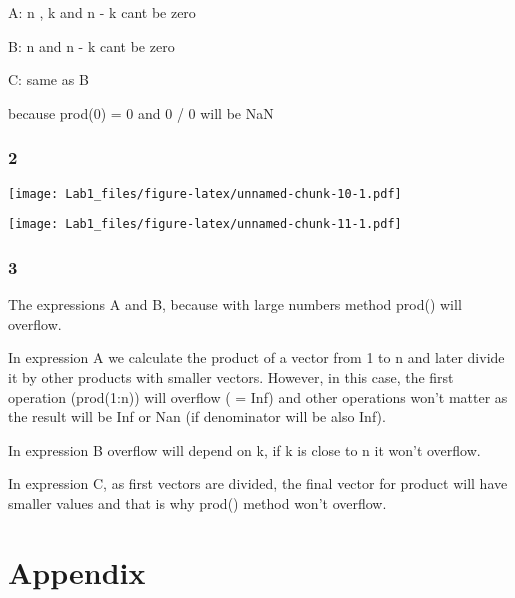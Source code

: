 \documentclass[
]{article}
\begin{document}
A: n , k and n - k cant be zero

B: n and n - k cant be zero

C: same as B

because prod(0) = 0 and 0 / 0 will be NaN

\hypertarget{section-10}{%
\subsubsection{2}\label{section-10}}

\texttt{[image: Lab1\_files/figure-latex/unnamed-chunk-10-1.pdf]}

\texttt{[image: Lab1\_files/figure-latex/unnamed-chunk-11-1.pdf]}

\hypertarget{section-11}{%
\subsubsection{3}\label{section-11}}

The expressions A and B, because with large numbers method prod() will
overflow.

In expression A we calculate the product of a vector from 1 to n and
later divide it by other products with smaller vectors. However, in this
case, the first operation (prod(1:n)) will overflow ( = Inf) and other
operations won't matter as the result will be Inf or Nan (if denominator
will be also Inf).

In expression B overflow will depend on k, if k is close to n it won't
overflow.

In expression C, as first vectors are divided, the final vector for
product will have smaller values and that is why prod() method won't
overflow.

\newpage

\hypertarget{appendix}{%
\section{Appendix}\label{appendix}}
\end{document}

